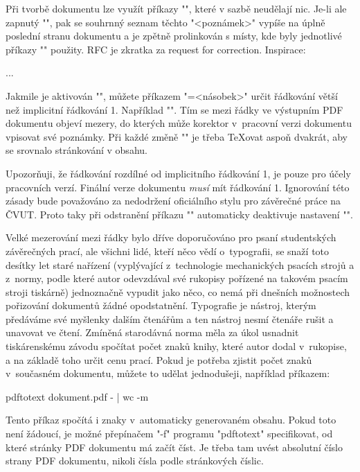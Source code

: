 Při tvorbě dokumentu lze využít příkazy "", 
které v sazbě neudělají nic. Je-li ale zapnutý
"\draft", pak se souhrnný seznam těchto "<poznámek>" vypíše na úplně poslední stranu
dokumentu a je zpětně prolinkován s místy, kde byly jednotlivé příkazy "\rfc"
použity. RFC je zkratka za request for correction. Inspirace:

\begtt
{}
...
\endtt
 
Jakmile je aktivován "\draft", můžete příkazem "\linespacing=<násobek>"
určit řádkování větší než implicitní řádkování 1. Například
"". Tím se mezi řádky ve výstupním PDF dokumentu 
objeví mezery, do kterých může korektor v~pracovní verzi dokumentu 
vpisovat své poznámky. Při každé změně "\linespacing" je třeba \TeX{}ovat
aspoň dvakrát, aby se srovnalo stránkování v obsahu.

Upozorňuji, že řádkování rozdílné od implicitního řádkování 1, je pouze pro
účely pracovních verzí. Finální verze dokumentu {\em musí} mít řádkování 1. 
Ignorování této zásady bude považováno za nedodržení oficiálního
stylu pro závěrečné práce na ČVUT. Proto taky \ctustyle{} při odstranění příkazu
"\draft" automaticky deaktivuje nastavení "\linespacing".

Velké mezerování mezi řádky bylo dříve
doporučováno pro psaní studentských závěrečných prací, ale všichni lidé, kteří
něco vědí o~typografii, se snaží toto desítky let staré nařízení (vyplývající
z~technologie mechanických psacích strojů a z~normy, podle které autor
odevzdával své rukopisy pořízené na takovém psacím stroji tiskárně) jednoznačně vypudit
jako něco, co nemá při dnešních možnostech pořizování dokumentů žádné
opodstatnění. Typografie je nástroj, kterým předáváme své myšlenky dalším
čtenářům a ten nástroj nesmí čtenáře rušit a unavovat ve čtení.
%
Zmíněná starodávná norma měla za úkol usnadnit tiskárenskému závodu
spočítat počet znaků knihy, které autor dodal v~rukopise, a na základě toho
určit cenu prací. Pokud je potřeba zjistit počet znaků v~současném dokumentu, 
můžete to udělat jednodušeji, například příkazem:

\begtt
pdftotext dokument.pdf - | wc -m
\endtt

Tento příkaz spočítá i znaky v~automaticky generovaném obsahu. Pokud toto
není žádoucí, je možné přepínačem "-f" programu "pdftotext" specifikovat, od
které stránky PDF dokumentu má začít číst. Je třeba tam uvést absolutní číslo
strany PDF dokumentu, nikoli čísla podle stránkových číslic.

